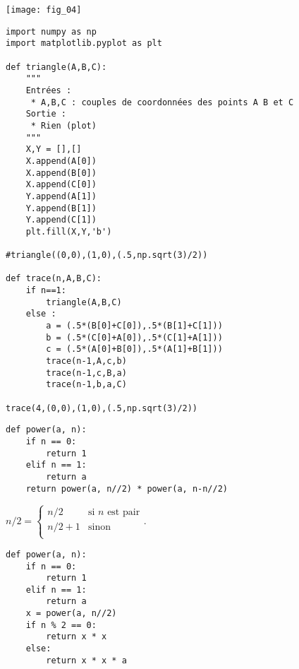 \begin{center}
\texttt{[image: fig\_04]}
\end{center}

\ifprof
\begin{corrige}
\begin{lstlisting}
import numpy as np
import matplotlib.pyplot as plt

def triangle(A,B,C):
    """
    Entrées :
     * A,B,C : couples de coordonnées des points A B et C
    Sortie : 
     * Rien (plot) 
    """
    X,Y = [],[]
    X.append(A[0])
    X.append(B[0])
    X.append(C[0])
    Y.append(A[1])
    Y.append(B[1])
    Y.append(C[1])
    plt.fill(X,Y,'b')

#triangle((0,0),(1,0),(.5,np.sqrt(3)/2))

def trace(n,A,B,C):
    if n==1:
        triangle(A,B,C)
    else :
        a = (.5*(B[0]+C[0]),.5*(B[1]+C[1]))
        b = (.5*(C[0]+A[0]),.5*(C[1]+A[1]))
        c = (.5*(A[0]+B[0]),.5*(A[1]+B[1]))
        trace(n-1,A,c,b)
        trace(n-1,c,B,a)
        trace(n-1,b,a,C)
        
trace(4,(0,0),(1,0),(.5,np.sqrt(3)/2))        
\end{lstlisting}
\end{corrige}
\else
\fi



\exer{}
\setcounter{question}{0}

\ifprof
\begin{corrige}
\begin{lstlisting}
def power(a, n):
    if n == 0:
        return 1
    elif n == 1:
        return a
    return power(a, n//2) * power(a, n-n//2)
\end{lstlisting}
\end{corrige}
\else
\fi

$n/2 = \left\{ 
\begin{array}{ll} 
n/2 & \text{si }n \text{ est pair} \\
n/2+1 & \text{sinon}\\
\end{array}
\right.
$.
\ifprof
\begin{corrige}
\begin{lstlisting}
def power(a, n):
    if n == 0:
        return 1
    elif n == 1:
        return a
    x = power(a, n//2)
    if n % 2 == 0:
        return x * x
    else:
        return x * x * a
\end{lstlisting}
\end{corrige}
\else
\fi


